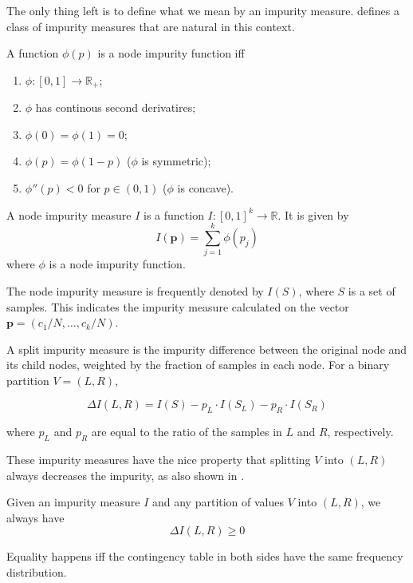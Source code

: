 The only thing left is to define what we mean by an impurity measure. \cite{Breiman84} defines a class of impurity measures that are natural in this context.

\begin{definition}

 A function $\phi(p)$ is a node impurity function iff 
 \begin{enumerate}
  \item $\phi: [0, 1] \rightarrow \mathbb{R}_+$;
  \item $\phi$ has continous second derivatires;
  \item $\phi(0) = \phi(1) = 0$;
  \item $\phi(p) = \phi(1-p)$ ($\phi$ is symmetric);
  \item $\phi''(p) < 0$ for $p \in (0, 1)$ ($\phi$ is concave).
 \end{enumerate}
\end{definition}


\begin{definition}

 A node impurity measure $I$ is a function $I: [0,1]^k \to \mathbb{R}$. It is given by
 $$I(\mathbf{p}) = \sum_{j=1}^{k}\phi(p_j)$$
 where $\phi$ is a node impurity function.
 
 The node impurity measure is frequently denoted by $I(S)$, where $S$ is a set of samples. This indicates the impurity measure calculated on the vector $\mathbf{p} = (c_1/N, \ldots, c_k/N)$.
\end{definition}

\begin{definition}

A split impurity measure is the impurity difference between the original node and its child nodes, weighted by the fraction of samples in each node. For a binary partition $V=(L,R)$,

$$\Delta I(L, R) = I(S) - p_L \cdot I(S_L) - p_R \cdot I(S_R)$$

where $p_L$ and $p_R$ are equal to the ratio of the samples in $L$ and $R$, respectively.
\end{definition}

These impurity measures have the nice property that splitting $V$ into $(L, R)$ always decreases the impurity, as also shown in \cite{Breiman84}.

\begin{theorem}
Given an impurity measure $I$ and any partition of values $V$ into $(L, R)$, we always have
$$\Delta I(L, R) \geq 0 $$

Equality happens iff the contingency table in both sides have the same frequency distribution.
\end{theorem}

